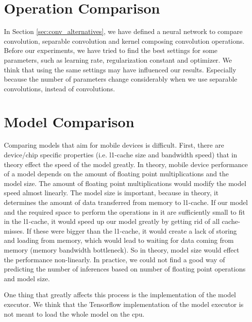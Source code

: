\section{Operation Comparison}
In Section \ref{sec:conv_alternatives}, we have defined a neural network to compare convolution, separable convolution and kernel composing convolution operations. Before our experiments, we have tried to find the best settings for some parameters, such as learning rate, regularization constant and optimizer. We think that using the same settings may have influenced our results. Especially because the number of parameters change considerably when we use separable convolutions, instead of convolutions. 

\iffalse
\section{Working with ImageNet}
Most of the research compares models based on ImageNet\cite{howard2017mobilenets} 
\fi

\section{Model Comparison}
Comparing models that aim for mobile devices is difficult. First, there are device/chip specific properties (i.e. l1-cache size and bandwidth speed) that in theory effect the speed of the model greatly. In theory, mobile device performance of a model depends on the amount of floating point multiplications and the model size. The amount of floating point multiplications would modify the model speed almost linearly. The model size is important, because in theory, it determines the amount of data transferred from memory to l1-cache. If our model and the required space to perform the operations in it are sufficiently small to fit in the l1-cache, it would speed up our model greatly by getting rid of all cache-misses. If these were bigger than the l1-cache, it would create a lack of storing and loading from memory, which would lead to waiting for data coming from memory (memory bandwidth bottleneck). So in theory, model size would effect the performance non-linearly. In practice, we could not find a good way of predicting the number of inferences based on number of floating point operations and model size. 

One thing that greatly affects this process is the implementation of the model executor. We think that the Tensorflow implementation of the model executor is not meant to load the whole model on the cpu. 

\iffalse
But as we understood, Tensorflow implementation is not executing models on model level, but on layer level (based on variable scopes). We think that is the case because when we look at a sufficiently small model's benchmarking results, we saw that the amount of context switches were equal to the number of variable scopes times the number of inferences.
\fi